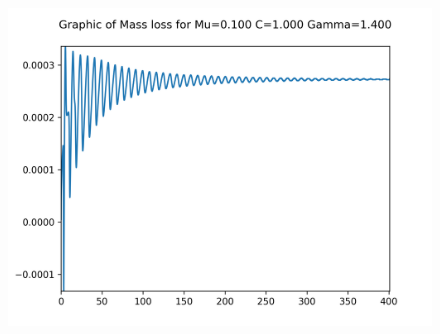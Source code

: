 \begin{figure}[H]
	\includegraphics[scale=0.65]{../graphs_data_nonsmooth_2/mass/Graph_mass_mu0.100_C1.000_gamma1.400.png}
\end{figure}


